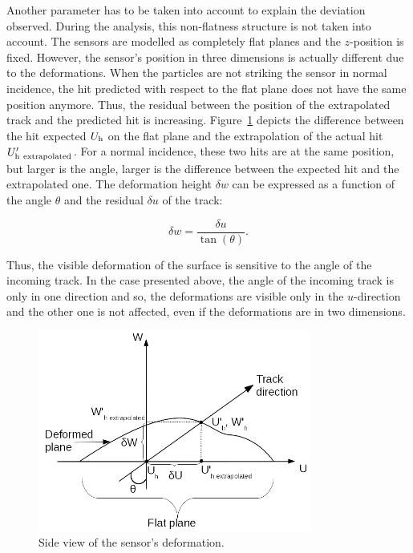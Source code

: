       Another parameter has to be taken into account to explain the deviation observed.
      During the analysis, this non-flatness structure is not taken into account.
      The sensors are modelled as completely flat planes and the $z$-position is fixed.
      However, the sensor's position in three dimensions is actually different due to the deformations.
      When the particles are not striking the sensor in normal incidence, the hit predicted with respect to the flat plane does not have the same position anymore.
      Thus, the residual between the position of the extrapolated track and the predicted hit is increasing.
      Figure~\ref{fig:originDef} depicts the difference between the hit expected $U_{\rm{h}}$ on the flat plane and the extrapolation of the actual hit $U'_{\rm{h~extrapolated}}$.
      For a normal incidence, these two hits are at the same position, but larger is the angle, larger is the difference between the expected hit and the extrapolated one.
      The deformation height $\delta w$ can be expressed as a function of the angle $\theta$ and the residual $\delta u$ of the track:

      \begin{equation}
        \delta w = \frac{\delta u}{\tan(\theta)}.
        \label{eq:deltaW}
      \end{equation}

      Thus, the visible deformation of the surface is sensitive to the angle of the incoming track.
      In the case presented above, the angle of the incoming track is only in one direction and so, the deformations are visible only in the $u$-direction and the other one is not affected, even if the deformations are in two dimensions.

      \begin{figure}[!h]
      \centering
        \includegraphics[width = 0.8\textwidth]{Pictures/deformation/origin_deformation.png}
        \caption{Side view of the sensor's deformation.}
        \label{fig:originDef}
      \end{figure}

